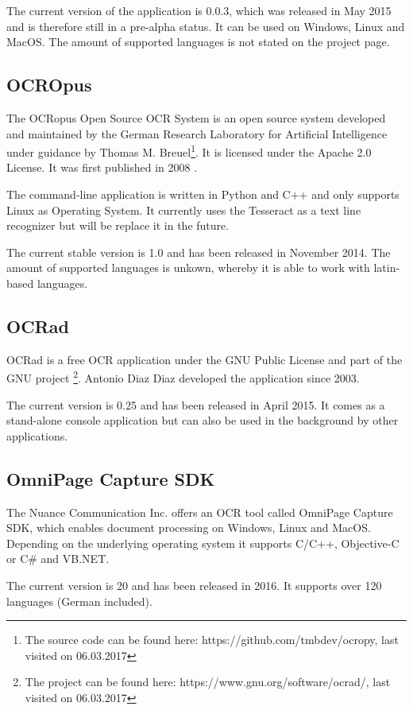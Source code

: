 The current version of the application is 0.0.3, which was released in May 2015 and is therefore still in a pre-alpha status. It can be used on Windows, Linux and MacOS. The amount of supported languages is not stated on the project page.

\subsection{OCROpus}
\label{sec3.1.7}
The OCRopus Open Source OCR System is an open source system developed and maintained by the German Research Laboratory for Artificial Intelligence under guidance by Thomas M. Breuel\footnote{The source code can be found here: https://github.com/tmbdev/ocropy, last visited on 06.03.2017}. It is licensed under the Apache 2.0 License. It was first published in 2008 \cite{Breuel08}.

The command-line application is written in Python and C++ and only supports Linux as Operating System. It currently uses the Tesseract as a text line recognizer but will be replace it in the future. 

The current stable version is 1.0 and has been released in November 2014. The amount of supported languages is unkown, whereby it is able to work with latin-based languages.

\label{OCRad}
\subsection{OCRad}
OCRad is a free OCR application under the GNU Public License and part of the GNU project \footnote{The project can be found here: https://www.gnu.org/software/ocrad/, last visited on 06.03.2017}. Antonio Diaz Diaz developed the application since 2003.

The current version is 0.25 and has been released in April 2015. It comes as a stand-alone console application but can also be used in the background by other applications.

\label{OmniPage}
\subsection{OmniPage Capture SDK}
The Nuance Communication Inc. offers an OCR tool called OmniPage Capture SDK, which enables document processing on Windows, Linux and MacOS. Depending on the underlying operating system it supports C/C++, Objective-C or C\# and VB.NET.

The current version is 20 and has been released in 2016. It supports over 120 languages (German included).

